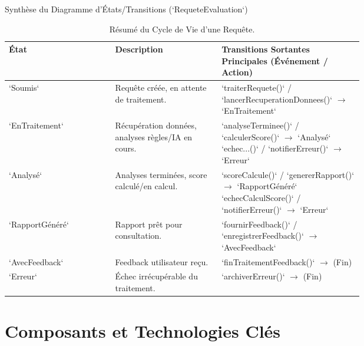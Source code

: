 \documentclass[9pt]{beamer}
\begin{document}
\begin{frame}{Synthèse du Diagramme d'États/Transitions (`RequeteEvaluation`)}
  \begin{table}[htbp]
    \centering
    \caption{Résumé du Cycle de Vie d'une Requête.}
    \label{tab:beamer_states_summary}
    \scriptsize %
    \begin{tabular}{@{}lp{0.3\linewidth}p{0.4\linewidth}@{}}
      \toprule
      État & Description & Transitions Sortantes Principales (Événement / Action) \\
      \midrule
      `Soumis` & Requête créée, en attente de traitement. & `traiterRequete()` / `lancerRecuperationDonnees()` $\rightarrow$ `EnTraitement` \\
      \addlinespace
      `EnTraitement` & Récupération données, analyses règles/IA en cours. & `analyseTerminee()` / `calculerScore()` $\rightarrow$ `Analysé` \newline `echec...()` / `notifierErreur()` $\rightarrow$ `Erreur` \\
      \addlinespace
      `Analysé` & Analyses terminées, score calculé/en calcul. & `scoreCalcule()` / `genererRapport()` $\rightarrow$ `RapportGénéré` \newline `echecCalculScore()` / `notifierErreur()` $\rightarrow$ `Erreur` \\
      \addlinespace
      `RapportGénéré` & Rapport prêt pour consultation. & `fournirFeedback()` / `enregistrerFeedback()` $\rightarrow$ `AvecFeedback` \\
      \addlinespace
      `AvecFeedback` & Feedback utilisateur reçu. & `finTraitementFeedback()` $\rightarrow$ (Fin) \\
      \addlinespace
      `Erreur` & Échec irrécupérable du traitement. & `archiverErreur()` $\rightarrow$ (Fin) \\
      \bottomrule
    \end{tabular}
  \end{table}
\end{frame}

\section{Composants et Technologies Clés}
\end{document}
